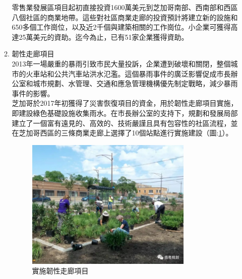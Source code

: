 \documentclass[a4paper,12pt]{article}
\begin{document}
\begin{enumerate}
\begin{enumerate}
零售業發展區項目起初直接投資1600萬美元到芝加哥南部、西南部和西區八個社區的商業地帶。這些對社區商業走廊的投資預計將建立新的設施和650多個工作崗位，以及近2千個與建築相關的工作崗位。小企業可獲得高達25萬美元的資助。迄今為止，已有51家企業獲得資助。\\

\item 韌性走廊項目\\
2013年一場嚴重的暴雨引致市民大量投訴，企業遭到破壞和關閉，整個城市的火車站和公共汽車站洪水氾濫。這個暴雨事件的廣泛影響促成市長辦公室和城市規劃、水管理、交通和應急管理機構優先制定戰略，減少暴雨事件的影響。\\

芝加哥於2017年初獲得了災害恢復項目的資金，用於韌性走廊項目實施，即建設綠色基礎設施收集雨水。在市長辦公室的支持下，規劃和發展局部建立了一個富有遠見的、高效的、技術嚴謹且具有包容性的社區流程，並在芝加哥西區的三條商業走廊上選擇了10個站點進行實施建設（圖:\ref{fig:Chicago-5}）。\\

\begin{figure}[htbp]
\centering
\includegraphics[width=300]{images/2021-03-24_15-24-43.jpg}
\caption{\label{fig:Chicago-5}實施韌性走廊項目}
\end{figure}


\end{enumerate}
\end{enumerate}
\end{document}
